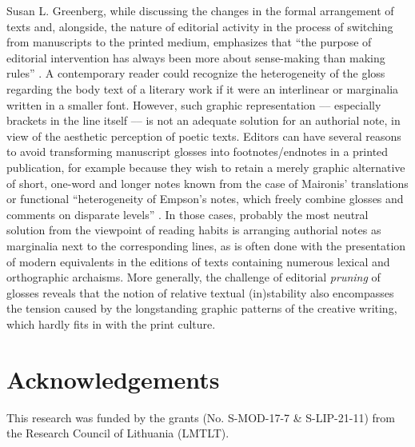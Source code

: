 \documentclass{article}
\begin{document}
Susan L. Greenberg, while discussing the changes in the formal
arrangement of texts and, alongside, the nature of editorial activity in
the process of switching from manuscripts to the printed medium,
emphasizes that ``the purpose of editorial intervention has always been
more about sense-making than making rules'' \citep[84]{greenberg_poetics_2018}. A
contemporary reader could recognize the heterogeneity of the gloss
regarding the body text of a literary work if it were an interlinear or
marginalia written in a smaller font. However, such graphic
representation –– especially brackets in the line itself –– is not an
adequate solution for an authorial note, in view of the aesthetic
perception of poetic texts. Editors can have several reasons to avoid
transforming manuscript glosses into footnotes/endnotes in a printed
publication, for example because they wish
to retain a merely graphic alternative of short, one-word and longer
notes known from the case of Maironis' translations or functional
``heterogeneity of Empson's notes, which freely combine glosses and
comments on disparate levels'' \citep[212]{dimitrova_decorus_2012}. In those cases, probably the most neutral solution from the viewpoint
of reading habits is arranging authorial notes as marginalia next to the
corresponding lines, as is often done with the presentation of modern
equivalents in the editions of texts containing numerous lexical and
orthographic archaisms. More generally, the challenge of editorial
\emph{pruning} of glosses reveals that the notion of relative textual
(in)stability also encompasses the tension caused by the longstanding
graphic patterns of the creative writing, which hardly fits in with the
print culture.

\section*{Acknowledgements}
This research was funded by the grants (No. S-MOD-17-7 \& S-LIP-21-11) from the Research Council of Lithuania (LMTLT).

\begin{flushleft}
    \renewcommand*{\mkbibnamefamily}[1]{\textsc{#1}}
    \renewcommand*{\mkbibnamegiven}[1]{\textsc{#1}} 
\printbibliography
\end{flushleft}
\end{document}
